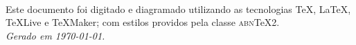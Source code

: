 \documentclass[
	12pt,				  %
	openright,	  %
	oneside,			%
	a4paper,			%
	english,			%
	french,				%
	spanish,			%
	brazil				%
	]{abntex2}
\begin{document}




\pagebreak\thispagestyle{empty}
~\vfill{}
\noindent
\begin{center}
Este documento foi digitado e diagramado utilizando as tecnologias \TeX{}, \LaTeX{}, \TeX{}Live e \TeX{}Maker; com estilos providos pela classe \textsc{abn}\TeX2. \\
\bigskip{}
\emph{Gerado em \today.}
\end{center}
\end{document}
